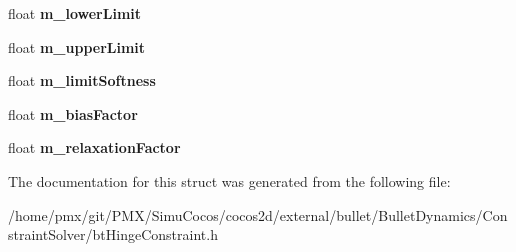 \begin{DoxyCompactItemize}
float {\bfseries m\+\_\+lower\+Limit}
\item 
\mbox{\label{structbtHingeConstraintFloatData_a1b9f4b9becfb4c857d75ec4022bc8279}} 
float {\bfseries m\+\_\+upper\+Limit}
\item 
\mbox{\label{structbtHingeConstraintFloatData_ad7f6c747ce281980911a9fa5481cb678}} 
float {\bfseries m\+\_\+limit\+Softness}
\item 
\mbox{\label{structbtHingeConstraintFloatData_a4d89d4b4715a4852f9cfa454328e627a}} 
float {\bfseries m\+\_\+bias\+Factor}
\item 
\mbox{\label{structbtHingeConstraintFloatData_ab46eef3a11248e144d81527545557779}} 
float {\bfseries m\+\_\+relaxation\+Factor}
\end{DoxyCompactItemize}


The documentation for this struct was generated from the following file\+:\begin{DoxyCompactItemize}
\item 
/home/pmx/git/\+P\+M\+X/\+Simu\+Cocos/cocos2d/external/bullet/\+Bullet\+Dynamics/\+Constraint\+Solver/bt\+Hinge\+Constraint.\+h\end{DoxyCompactItemize}

